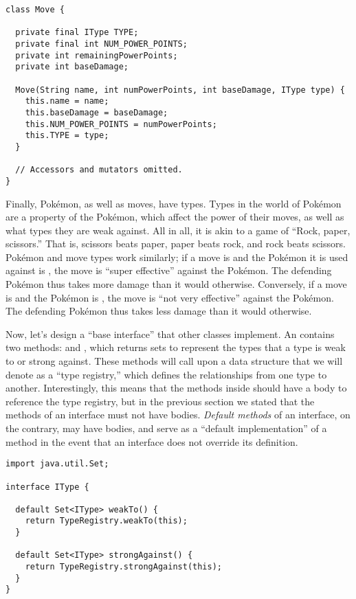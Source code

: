 \begin{lstlisting}[language=MyJava]
class Move {

  private final IType TYPE;
  private final int NUM_POWER_POINTS;
  private int remainingPowerPoints;
  private int baseDamage;

  Move(String name, int numPowerPoints, int baseDamage, IType type) {
    this.name = name;
    this.baseDamage = baseDamage;
    this.NUM_POWER_POINTS = numPowerPoints;
    this.TYPE = type;
  }

  // Accessors and mutators omitted.
}
\end{lstlisting}

Finally, Pok\'emon, as well as moves, have types. Types in the world of Pok\'emon are a property of the Pok\'emon, which affect the power of their moves, as well as what types they are weak against. All in all, it is akin to a game of ``Rock, paper, scissors.'' That is, scissors beats paper, paper beats rock, and rock beats scissors. Pok\'emon and move types work similarly; if a move is  and the Pok\'emon it is used against is , the move is ``super effective'' against the Pok\'emon. The defending Pok\'emon thus takes more damage than it would otherwise. Conversely, if a move is  and the Pok\'emon is , the move is ``not very effective'' against the Pok\'emon. The defending Pok\'emon thus takes less damage than it would otherwise. 

Now, let's design a ``base interface'' that other classes implement. An  contains two methods:  and , which returns sets to represent the types that a type is weak to or strong against. These methods will call upon a data structure that we will denote as a ``type registry,'' which defines the relationships from one type to another. Interestingly, this means that the methods inside  should have a body to reference the type registry, but in the previous section we stated that the methods of an interface must not have bodies. \emph{Default methods} of an interface, on the contrary, may have bodies, and serve as a ``default implementation'' of a method in the event that an interface does not override its definition.

\begin{lstlisting}[language=MyJava]
import java.util.Set;

interface IType {

  default Set<IType> weakTo() {
    return TypeRegistry.weakTo(this);
  }

  default Set<IType> strongAgainst() {
    return TypeRegistry.strongAgainst(this);
  }
}
\end{lstlisting}

